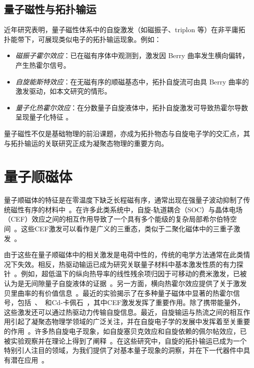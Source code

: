 \subsection{量子磁性与拓扑输运}

近年研究表明，量子磁性体系中的自旋激发（如磁振子、triplon 等）在非平庸拓扑能带下，可展现类似电子的拓扑输运现象。例如：
\begin{itemize}
    \item \emph{磁振子霍尔效应}：已在磁有序体中观测到，激发因 Berry 曲率发生横向偏转，产生热霍尔信号。
    \item \emph{自旋能斯特效应}：在无磁有序的顺磁基态中，拓扑自旋流可由具 Berry 曲率的激发驱动，如本文研究的情形。
    \item \emph{量子化热霍尔效应}：在分数量子自旋液体中，拓扑自旋激发可导致热霍尔导数呈现量子化特征 \cite{kasahara2018Majorana}。
\end{itemize}

量子磁性不仅是基础物理的前沿课题，亦成为拓扑物态与自旋电子学的交汇点，其与拓扑输运的关联研究正成为凝聚态物理的重要方向。
    
    \section{量子顺磁体}
    量子顺磁体的特征是在零温度下缺乏长程磁有序，通常出现在强量子波动抑制了传统磁性有序的材料中~\cite{knolle2019Field}。在许多此类系统中，自旋-轨道耦合（SOC）与晶体电场（CEF）效应之间的相互作用导致了一个具有多个能级的复杂局部希尔伯特空间~\cite{rau2016SpinOrbit}。这些CEF激发可以看作是广义的三重态，类似于二聚化磁体中的三重子激发~\cite{akbari2023Topological, mcclarty2017Topological, romhanyi2015Hall}。

    由于这些在量子顺磁体中的相关激发是电荷中性的，传统的电学方法通常在此类情况下失效。相反，热驱动输运已成为研究关联量子材料中基本激发性质的有力探针~\cite{zhang2024Thermal, onose2010Observation, katsura2010theory}。例如，超低温下的纵向热导率的线性残余项归因于可移动的费米激发，已被认为是无间隙量子自旋液体的证据~\cite{ni2019Absence, bourgeois-hope2019Thermal, zhu2023Fluctuating}。另一方面，横向热霍尔效应提供了关于激发贝里曲率的有价值信息~\cite{zhang2024Thermal, ma2024upper, boulanger2020Thermal}。最近的实验揭示了在多种量子磁体中显著的热霍尔信号，包括~\cite{li2013Phononglasslike}、~\cite{tokiwa2016Possible}和Cd-卡佩石~\cite{akazawa2020Thermal}，其中CEF激发发挥了重要作用。除了携带能量外，这些激发还可以通过热驱动力传输自旋信息。最近，自旋输运与热流之间的相互作用引起了凝聚态物理学领域的广泛关注，并在自旋电子学的发展中发挥着至关重要的作用~\cite{zutic2004Spintronics, hoffmann2015Opportunities, barker2021Review, elahi2022Review, nakayama2021Aboveroomtemperature, back2019Special, uchida2021Spintronica}。许多热自旋电子现象，如自旋塞贝克效应和自旋依赖的佩尔帖效应，已被实验观察并在理论上得到了阐释~\cite{flipse2012Direct, bakker2010Interplay, maekawa2017spin, bhardwaj2018Spin, adachi2013Theory, uchida2016Thermoelectric, ma2020longitudinal}。在这些研究中，自旋的拓扑输运已成为一个特别引人注目的领域，为我们提供了对基本量子现象的洞察，并在下一代器件中具有潜在应用~\cite{armitage2018Weyl, tokura2019Magnetic}。

